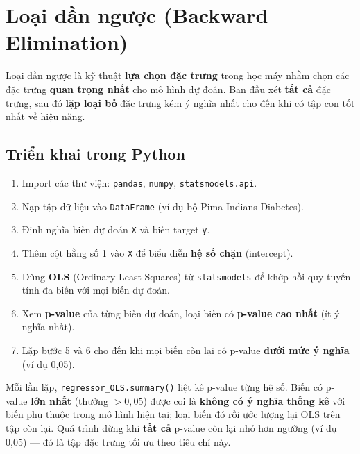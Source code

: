 \section{Loại dần ngược (Backward Elimination)}
\label{sec:backward-elimination}

\begin{dinhnghia}[title={Backward Elimination}]
Loại dần ngược là kỹ thuật \textbf{lựa chọn đặc trưng} trong học máy nhằm chọn các đặc trưng \textbf{quan trọng nhất} cho mô hình dự đoán. Ban đầu xét \textbf{tất cả} đặc trưng, sau đó \textbf{lặp loại bỏ} đặc trưng kém ý nghĩa nhất cho đến khi có tập con tốt nhất về hiệu năng.
\end{dinhnghia}

\subsection{Triển khai trong Python}

\begin{phuongphap}[title={Các bước triển khai}]
\begin{enumerate}
  \item Import các thư viện: \texttt{pandas}, \texttt{numpy}, \texttt{statsmodels.api}.
  \item Nạp tập dữ liệu vào \texttt{DataFrame} (ví dụ bộ Pima Indians Diabetes).
  \item Định nghĩa biến dự đoán \texttt{X} và biến target \texttt{y}.
  \item Thêm cột hằng số 1 vào \texttt{X} để biểu diễn \textbf{hệ số chặn} (intercept).
  \item Dùng \textbf{OLS} (Ordinary Least Squares) từ \texttt{statsmodels} để khớp hồi quy tuyến tính đa biến với mọi biến dự đoán.
  \item Xem \textbf{p-value} của từng biến dự đoán, loại biến có \textbf{p-value cao nhất} (ít ý nghĩa nhất).
  \item Lặp bước 5 và 6 cho đến khi mọi biến còn lại có p-value \textbf{dưới mức ý nghĩa} (ví dụ 0{,}05).
\end{enumerate}
\end{phuongphap}

\begin{ynghia}[title={Vòng lặp p-value}]
Mỗi lần lặp, \texttt{regressor\_OLS.summary()} liệt kê p-value từng hệ số. Biến có p-value \textbf{lớn nhất} (thường $> 0{,}05$) được coi là \textbf{không có ý nghĩa thống kê} với biến phụ thuộc trong mô hình hiện tại; loại biến đó rồi ước lượng lại OLS trên tập còn lại. Quá trình dừng khi \textbf{tất cả} p-value còn lại nhỏ hơn ngưỡng (ví dụ 0{,}05) --- đó là tập đặc trưng tối ưu theo tiêu chí này.
\end{ynghia}

